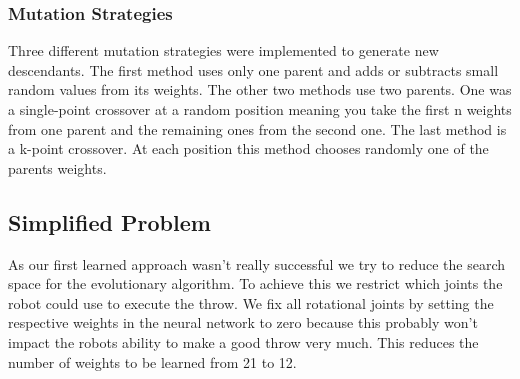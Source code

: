 \subsubsection{Mutation Strategies}
Three different mutation strategies were implemented to generate new descendants.
The first method uses only one parent and adds or subtracts small random values from its weights.
The other two methods use two parents.
One was a single-point crossover at a random position meaning you take the first n weights from one parent and the remaining ones from the second one.
The last method is a k-point crossover.
At each position this method chooses randomly one of the parents weights.

\subsection{Simplified Problem}
As our first learned approach wasn't really successful we try to reduce the search space for the evolutionary algorithm.
To achieve this we restrict which joints the robot could use to execute the throw.
We fix all rotational joints by setting the respective weights in the neural network to zero because this probably won't impact the robots ability to make a good throw very much.
This reduces the number of weights to be learned from 21 to 12.